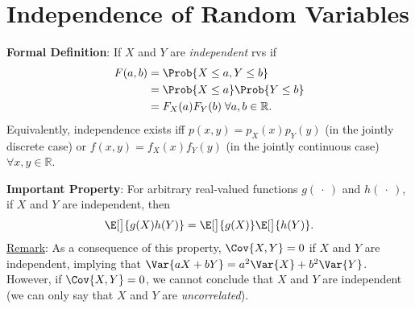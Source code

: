 \section*{Independence of Random Variables}
\begin{Regular}
    \textbf{Formal Definition}: If $ X $ and $ Y $ are \emph{independent} rvs if
    \begin{align*}
        F(a,b)
         & =\Prob{X\le a,Y\le b}                     \\
         & =\Prob{X\le a}\Prob{Y\le b}               \\
         & =F_X(a)F_Y(b)\; \forall a,b\in\mathbb{R}.
    \end{align*}
    Equivalently, independence exists iff $ p(x,y)=p_X(x)p_Y(y) $ (in the jointly discrete case)
    or $ f(x,y)=f_X(x)f_Y(y) $ (in the jointly continuous case) $ \forall x,y\in\mathbb{R} $.
\end{Regular}
\begin{Regular}
    \textbf{Important Property}: For arbitrary real-valued functions $ g(\:\cdot\:) $ and $ h(\:\cdot\:) $, if $ X $ and $ Y $ are independent,
    then
    \[ \E[\big]{g(X)h(Y)}=\E[\big]{g(X)}\E[\big]{h(Y)}. \]
    \tcblower{}
    \underline{Remark}: As a consequence of this property, $ \Cov{X,Y}=0 $ if $ X $ and $ Y $ are independent,
    implying that $ \Var{aX+bY}=a^2\Var{X}+b^2\Var{Y} $. However, if $ \Cov{X,Y}=0 $, we cannot conclude that $ X $
    and $ Y $ are independent (we can only say that $ X $ and $ Y $ are \emph{uncorrelated}).
\end{Regular}
